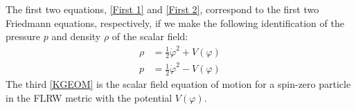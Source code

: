 \documentclass[aps,prd,reprint,preprintnumbers,showpacs,floatfix,nofootinbib,superscript address]{revtex4-2}
\newcommand{\wb}[1]{{\color[RGB]{255,0,0}{\textbf{\textit{[WB: #1]}}}}}
\begin{document}

The first two equations, \cref{First 1} and \cref{First 2}, correspond to the first two Friedmann equations, respectively, if we make the following identification of the pressure $p$ and density $\rho$ of the scalar field:
\begin{align}   \label{presure and density}
    \rho &= \frac{1}{2} \dot{\varphi}^2 + V(\varphi) \\
    p &= \frac{1}{2} \dot{\varphi}^2 - V(\varphi)
\end{align}
The third \cref{KGEOM} is the scalar field equation of motion for a spin-zero particle in the FLRW metric with the potential $V(\varphi)$. 

\end{document}
